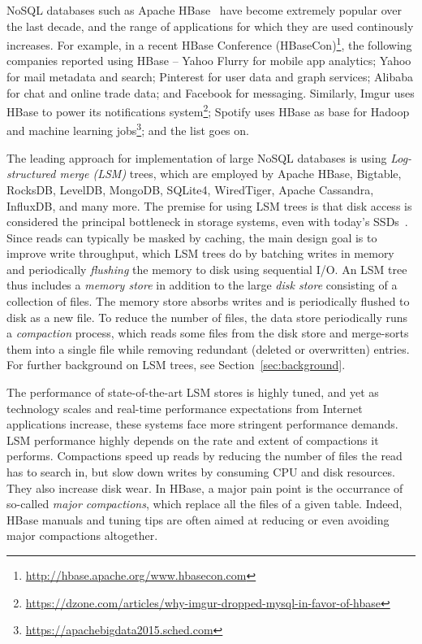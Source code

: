 
NoSQL databases such as Apache HBase~\cite{hbase} 
have become extremely popular over the last decade, and the range of applications for which they are used continously increases. 
For example, in a recent HBase Conference (HBaseCon)\footnote{\url{http://hbase.apache.org/www.hbasecon.com}}, 
the following companies reported using HBase -- 
Yahoo Flurry for mobile app analytics; Yahoo for mail metadata and search; Pinterest for user data and graph services; 
Alibaba for chat and online trade data; and Facebook for messaging. Similarly, 
Imgur uses HBase to power its notifications system\footnote{\url{https://dzone.com/articles/why-imgur-dropped-mysql-in-favor-of-hbase}};
Spotify uses HBase as base for Hadoop and machine learning
jobs\footnote{\url{https://apachebigdata2015.sched.com}};
and the list goes on. 

The leading approach for implementation of large NoSQL databases is using 
 \emph{Log-structured merge (LSM)} trees, which are employed by  
Apache HBase, Bigtable, RocksDB, LevelDB, MongoDB, SQLite4, WiredTiger, Apache Cassandra,  InfluxDB, and many more.
The premise for using LSM trees is that disk access is considered the 
principal bottleneck in storage systems, even with today's SSDs~\cite{rocksdb,Tanenbaum:2014:MOS:2655363,Wu:2012:AWB:2093139.2093140}.
Since reads can typically be masked by caching, the main design goal is to improve write throughput, which LSM trees do by batching 
writes in memory and periodically \emph{flushing} the  memory  to disk using sequential I/O.
An LSM tree thus includes a \emph{memory store} in addition to the large  \emph{disk store} consisting of a collection of files. 
The memory store absorbs writes and is periodically flushed to disk as a new file. 
To reduce the number of files, the data store periodically runs a \emph{compaction} process, which reads some files from the disk store
and merge-sorts them into a single file while removing redundant (deleted or overwritten) entries. 
For further background on %
LSM trees, see Section~\ref{sec:background}.

The performance of state-of-the-art LSM stores is highly tuned, and yet as technology scales 
and real-time performance expectations from Internet applications increase, these systems face more stringent performance demands.
LSM performance highly depends on the rate and extent of compactions it performs. 
Compactions speed up reads by reducing the number of files the read has to search in, but slow down writes by consuming 
CPU and disk resources. They also increase disk wear.    
In HBase, a major pain point is the occurrance of so-called \emph{major compactions}, which replace all the files of a given table.
Indeed, HBase manuals and tuning tips are often aimed at reducing or even avoiding major compactions altogether.

